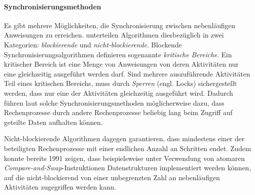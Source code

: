\paragraph{Synchronisierungsmethoden} Es gibt mehrere Möglichkeiten, die Synchronisierung zwischen nebenläufigen Anweisungen zu erreichen. \textcite{Michael1996} unterteilen Algorithmen diesbezüglich in zwei Kategorien: \emph{blockierende} und \emph{nicht-blockierende}. Blockende Synchronisierungsalgorithmen definieren sogenannte \emph{kritische Bereiche}. Ein kritischer Bereich ist eine Menge von Anweisungen von deren Aktivitäten nur eine gleichzeitig ausgeführt werden darf. Sind mehrere auszuführende Aktivitäten Teil eines kritischen Bereichs, muss durch \emph{Sperren} (engl. Locks) sichergestellt werden, dass nur eine der Aktivitäten gleichzeitig ausgeführt wird. Dadurch führen laut \textcite{Michael1996} solche Synchronisierungsmethoden möglicherweise dazu, dass Rechenprozesse durch andere Rechenprozesse beliebig lang beim Zugriff auf geteilte Daten aufhalten können.

Nicht-blockierende Algorithmen dagegen garantieren, dass mindestens einer der beteiligten Rechenprozesse mit einer endlichen Anzahl an Schritten endet. Zudem konnte \textcite{Herlihy1991} bereits 1991 zeigen, dass beispielsweise unter Verwendung von atomaren \emph{Compare-and-Swap}-Instruktionen Datenstrukturen implementiert werden können, auf die nicht-blockierend von einer unbegrenzten Zahl an nebenläufigen Aktivitäten zugegriffen werden kann.
